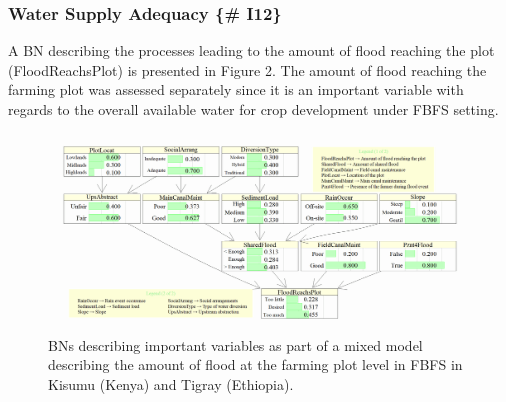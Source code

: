 \documentclass[12pt,oneside]{article}
\begin{document}
\hypertarget{water-supply-adequacy-i12}{%
\subsubsection{Water Supply Adequacy \{\# I12\}}\label{water-supply-adequacy-i12}}

A BN describing the processes leading to the amount of flood reaching the plot (FloodReachsPlot) is presented in Figure 2. The amount of flood reaching the farming plot was assessed separately since it is an important variable with regards to the overall available water for crop development under FBFS setting.

\begin{figure}[!htbp]

{\centering \includegraphics[width=1\linewidth,]{figures/Modelling_FBFS_Suppl_flood_reaching_plot_BNs_plot} 

}

\caption{BNs describing important variables as part of a mixed model describing the amount of flood at the farming plot level in FBFS in Kisumu (Kenya) and Tigray (Ethiopia).}\label{fig:fig2}
\end{figure}
\end{document}
